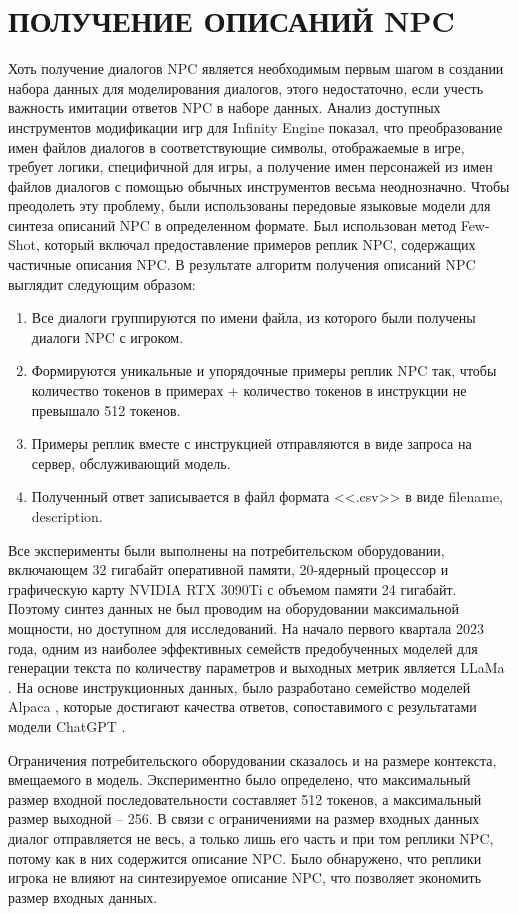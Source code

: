 \section{ПОЛУЧЕНИЕ ОПИСАНИЙ NPC}

Хоть получение диалогов NPC является необходимым первым шагом в создании набора данных для моделирования диалогов, этого недостаточно, если учесть важность имитации ответов NPC в наборе данных. Анализ доступных инструментов модификации игр для Infinity Engine показал, что преобразование имен файлов диалогов в соответствующие символы, отображаемые в игре, требует логики, специфичной для игры, а получение имен персонажей из имен файлов диалогов с помощью обычных инструментов весьма неоднозначно. Чтобы преодолеть эту проблему, были использованы передовые языковые модели для синтеза описаний NPC в определенном формате. Был использован метод Few-Shot, который включал предоставление примеров реплик NPC, содержащих частичные описания NPC. В результате алгоритм получения описаний NPC выглядит следующим образом:
\begin{enumerate}
  \item Все диалоги группируются по имени файла, из которого были получены диалоги NPC с игроком.
  \item Формируются уникальные и упорядочные примеры реплик NPC так, чтобы количество токенов в примерах + количество токенов в инструкции не превышало 512 токенов.
  \item Примеры реплик вместе с инструкцией отправляются в виде запроса на сервер, обслуживающий модель.
  \item Полученный ответ записывается в файл формата <<.csv>> в виде filename, description.
\end{enumerate}

Все эксперименты были выполнены на потребительском оборудовании, включающем 32 гигабайт оперативной памяти, 20-ядерный процессор и графическую карту NVIDIA RTX 3090Ti с объемом памяти 24 гигабайт. Поэтому синтез данных не был проводим на оборудовании максимальной мощности, но доступном для исследований. На начало первого квартала 2023 года, одним из наиболее эффективных семейств предобученных моделей для генерации текста по количеству параметров и выходных метрик является LLaMa \cite{llama-paper}. На основе инструкционных данных, было разработано семейство моделей Alpaca \cite{alpaca-docs}, которые достигают качества ответов, сопоставимого с результатами модели ChatGPT \cite{chatgpt-docs}.

Ограничения потребительского оборудовании сказалось и на размере контекста, вмещаемого в модель. Экспериментно было определено, что максимальный размер входной последовательности составляет 512 токенов, а максимальный размер выходной -- 256. В связи с ограничениями на размер входных данных диалог отправляется не весь, а только лишь его часть и при том реплики NPC, потому как в них содержится описание NPC. Было обнаружено, что реплики игрока не влияют на синтезируемое описание NPC, что позволяет экономить размер входных данных. 

